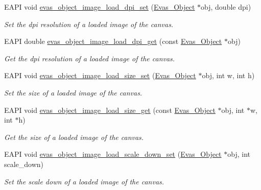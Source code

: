 \begin{DoxyCompactItemize}
EAPI void \hyperlink{group__Evas__Object__Image_ga88a20331cef0267ddc1d00419841580b}{evas\_\-object\_\-image\_\-load\_\-dpi\_\-set} (\hyperlink{group__Evas__Object__Group_ga9e19e6dd1f517a0ba437c0114d3e7c97}{Evas\_\-Object} $\ast$obj, double dpi)
\begin{DoxyCompactList}\small\item\em Set the dpi resolution of a loaded image of the canvas. \item\end{DoxyCompactList}\item 
EAPI double \hyperlink{group__Evas__Object__Image_ga92a5503085a5c0731bb9c299e7b42f78}{evas\_\-object\_\-image\_\-load\_\-dpi\_\-get} (const \hyperlink{group__Evas__Object__Group_ga9e19e6dd1f517a0ba437c0114d3e7c97}{Evas\_\-Object} $\ast$obj)
\begin{DoxyCompactList}\small\item\em Get the dpi resolution of a loaded image of the canvas. \item\end{DoxyCompactList}\item 
EAPI void \hyperlink{group__Evas__Object__Image_ga1811fb73c1e138b5221cf4b25148111a}{evas\_\-object\_\-image\_\-load\_\-size\_\-set} (\hyperlink{group__Evas__Object__Group_ga9e19e6dd1f517a0ba437c0114d3e7c97}{Evas\_\-Object} $\ast$obj, int w, int h)
\begin{DoxyCompactList}\small\item\em Set the size of a loaded image of the canvas. \item\end{DoxyCompactList}\item 
EAPI void \hyperlink{group__Evas__Object__Image_gae8047183e894e1e1245f1f3aaf78f218}{evas\_\-object\_\-image\_\-load\_\-size\_\-get} (const \hyperlink{group__Evas__Object__Group_ga9e19e6dd1f517a0ba437c0114d3e7c97}{Evas\_\-Object} $\ast$obj, int $\ast$w, int $\ast$h)
\begin{DoxyCompactList}\small\item\em Get the size of a loaded image of the canvas. \item\end{DoxyCompactList}\item 
EAPI void \hyperlink{group__Evas__Object__Image_ga59796713b88c217ce5869cb003e404c0}{evas\_\-object\_\-image\_\-load\_\-scale\_\-down\_\-set} (\hyperlink{group__Evas__Object__Group_ga9e19e6dd1f517a0ba437c0114d3e7c97}{Evas\_\-Object} $\ast$obj, int scale\_\-down)
\begin{DoxyCompactList}\small\item\em Set the scale down of a loaded image of the canvas. \item\end{DoxyCompactList}\item 

\end{DoxyCompactItemize}
